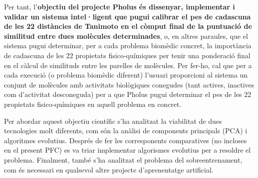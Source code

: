 Per tant, l'{\bf objectiu del projecte Pholus és dissenyar, implementar i validar un sistema intel·ligent que pugui calibrar el pes de cadascuna de les 22 distàncies de
Tanimoto en el còmput final de la puntuació de similitud entre dues molècules determinades}, o, en altres paraules, que el sistema pugui determinar, per a cada problema
biomèdic concret, la importància de cadascuna de les 22 propietats fisico-químiques per tenir una ponderació final en el càlcul de similituds entre les parelles de molècules.
Per fer-ho, cal que per a cada execució (o problema biomèdic diferent) l'usuari proporcioni al sistema un conjunt de molècules amb activitats biològiques conegudes
(tant actives, inactives com d'activitat desconeguda) per a que Pholus pugui determinar el pes de les 22 propietats fisico-químiques en aquell problema en concret.

Per abordar aquest objectiu científic s'ha analitzat la viabilitat de dues tecnologies molt diferents, com són la anàlisi de components principals (PCA) i algoritmes evolutius.
Després de fer les corresponents comparatives (no incloses en el present PFC) es va triar implementar algorismes evolutius per a resoldre el problema. Finalment, també
s'ha analitzat el problema del sobreentrenament, com és necessari en qualsevol altre projecte d'aprenentatge artificial.






